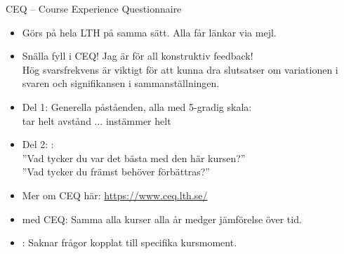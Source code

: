 
\begin{Slide}{CEQ -- Course Experience Questionnaire}\SlideFontSmall
\begin{itemize}
\item Görs på hela LTH på samma sätt. Alla får länkar via mejl.
\item Snälla fyll i CEQ! Jag är  för all konstruktiv feedback! \\ Hög svarsfrekvens är viktigt för att kunna dra slutsatser om variationen i svaren och signifikansen i sammanställningen.
\item Del 1: Generella påståenden, alla med 5-gradig skala: \\ tar helt avstånd ... instämmer helt
\item Del 2: : \\
''Vad  tycker  du  var  det  bästa  med  den här  kursen?'' \\
''Vad  tycker  du  främst  behöver  förbättras?''
\item Mer om CEQ här: \url{https://www.ceq.lth.se/}
\item {} med CEQ: Samma alla kurser alla år medger jämförelse över tid.
\item {}: Saknar frågor kopplat till specifika kursmoment.
\end{itemize}
\end{Slide}

